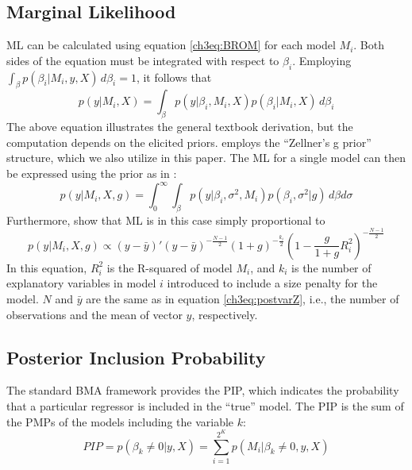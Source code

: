 \begin{refsection}
\begin{subappendices}
    \subsection*{Marginal Likelihood}\label{ch3sec:ML}
    ML can be calculated using equation \ref{ch3eq:BROM} for each model $M_{i}$. Both sides of the equation must be integrated with respect to $\beta_{i}$. Employing $\int_{\beta} p(\beta_{i}\vert M_{i},y,X) \, d\beta_{i}=1$, it follows that
    \begin{equation}\label{ch3eq:ML}
    p(y \vert  M_{i},X) = \int_{\beta}{p(y \vert \beta_{i},M_{i},X)p(\beta_{i} \vert M_{i},X) \, d\beta_{i}}
    \end{equation}
    The above equation illustrates the general textbook derivation, but the computation depends on the elicited priors. \textcite{Zeugner2011} employs the ``Zellner's g prior'' structure, which we also utilize in this paper. The ML for a single model can then be expressed using the prior as in \textcite{FeldkircherZeugner2009}:
    \begin{equation}\label{ch3eq:MLFZ}
    p(y \vert  M_{i},X,g) = \int_{0}^{\infty}{\int_{\beta}{p(y \vert \beta_{i}, \sigma^{2},M_{i})p(\beta_{i},\sigma^{2} \vert g) \, d\beta d\sigma}}
    \end{equation}
    Furthermore, \textcite{FeldkircherZeugner2009} show that ML is in this case simply proportional to
    \begin{equation}
    \label{ch3eq:MLg}
    p(y \vert M_{i}, X, g) \propto (y-\bar{y})'(y-\bar{y})^{- \frac{N-1}{2}} (1+g)^{- \frac{k_{i}}{2}} \left(1- \frac{g}{1+g}R^{2}_{i} \right)^{- \frac{N-1}{2}}
    \end{equation}
    In this equation, $R^{2}_{i}$ is the R-squared of model $M_{i}$, and $k_{i}$ is the number of explanatory variables in model $i$ introduced to include a size penalty for the model. $N$ and $\bar{y}$ are the same as in equation \ref{ch3eq:postvarZ}, i.e., the number of observations and the mean of vector $y$, respectively.
    \subsection*{Posterior Inclusion Probability}
    The standard \ac{BMA} framework provides the \ac{PIP}, which indicates the probability that a particular regressor is included in the ``true'' model. The \ac{PIP} is the sum of the \acp{PMP} of the models including the variable $k$:
    \begin{equation}\label{ch3eq:PIP}
    PIP = p(\beta_{k} \neq 0 \vert y, X) = \sum_{i=1}^{2^{K}} p(M_{i} \vert \beta_{k} \neq 0, y, X)
    \end{equation}
    

\end{subappendices}
\end{refsection}
